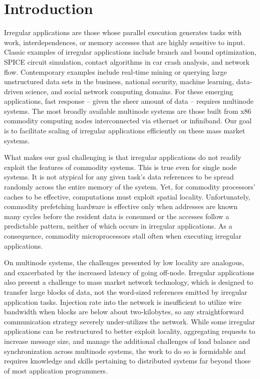 \section{Introduction} \label{sec:intro}

Irregular applications are those whose parallel execution generates tasks with work, interdependences, or memory accesses that are highly sensitive to input.  Classic examples of irregular applications include branch and bound optimization, SPICE circuit simulation, contact algorithms in car crash analysis, and network flow.  Contemporary examples include real-time mining or querying large unstructured data sets in the business, national security, machine learning, data-driven science, and social network computing domains.  For these emerging applications, fast response -- given the sheer amount of data -- requires multinode systems.  The most broadly available multinode systems are those built from x86 commodity computing nodes interconnected via ethernet or infiniband.  Our goal is to facilitate scaling of irregular applications efficiently on these mass market systems.

What makes our goal challenging is that irregular applications do not readily exploit the features of commodity systems.  This is true even for single node systems.  It is not atypical for any given task's data references to be spread randomly across the entire memory of the system. Yet, for commodity processors' caches to be effective, computations must exploit spatial locality.  Unfortunately, commodity prefetching hardware is effective only when addresses are known many cycles before the resident data is consumed or the accesses follow a predictable pattern, neither of which occurs in irregular applications.  As a consequence, commodity microprocessors stall often when executing irregular applications.

On multinode systems, the challenges presented by low locality are analogous, and exacerbated by the increased latency of going off-node.  Irregular applications also present a challenge to mass market network technology, which is designed to transfer large blocks of data, not the word-sized references emitted by irregular application tasks.  Injection rate into the network is insufficient to utilize wire bandwidth when blocks are below about two-kilobytes, so any straightforward communication strategy severely under-utilizes the network.  While some irregular applications can be restructured to better exploit locality, aggregating requests to increase message size, and manage the additional challenges of load balance and synchronization across multinode systems, the work to do so is formidable and requires knowledge and skills pertaining to distributed systems far beyond those of most application programmers.

